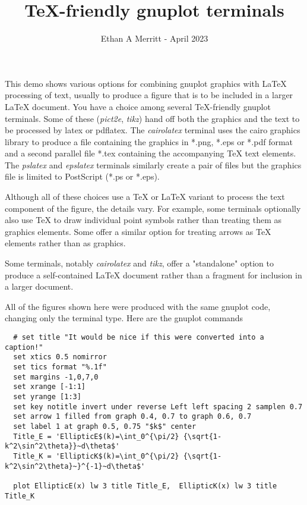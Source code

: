 \documentclass[letterpaper,11pt]{article}
\begin{document}
\title {\vspace{-.75in} \TeX-friendly gnuplot terminals \vspace{-5pt}}
\author{Ethan A Merritt - April 2023}
\date{}
\maketitle

This demo shows various options for combining gnuplot graphics with
{\LaTeX} processing of text, usually to produce a figure that is to be
included in a larger {\LaTeX} document.
You have a choice among several \TeX-friendly gnuplot terminals.
Some of these ({\em pict2e}, {\em tikz}) hand off both the graphics
and the text to be processed by latex or pdflatex.
The {\em cairolatex} terminal uses the cairo graphics library to produce
a file containing the graphics in *.png, *.eps or *.pdf format and a
second parallel file *.tex containing the accompanying {\TeX} text elements.
The {\em pslatex} and {\em epslatex} terminals similarly create a pair of
files but the graphics file is limited to PostScript (*.ps or *.eps).

Although all of these choices use a {\TeX} or {\LaTeX} variant to process the
text component of the figure, the details vary.  For example,
some terminals optionally also use {\TeX} to draw individual point
symbols rather than treating them as graphics elements. Some
offer a similar option for treating arrows as {\TeX} elements rather
than as graphics.

Some terminals, notably {\em cairolatex} and {\em tikz}, offer a
"standalone" option to produce a self-contained {\LaTeX} document
rather than a fragment for inclusion in a larger document.

All of the figures shown here were produced with the same gnuplot code,
changing only the terminal type.  Here are the gnuplot commands

\begin{framed}
\begin{minipage}{\textwidth}
\begin{verbatim}
  # set title "It would be nice if this were converted into a caption!"
  set xtics 0.5 nomirror
  set tics format "%.1f"
  set margins -1,0,7,0
  set xrange [-1:1]
  set yrange [1:3]
  set key notitle invert under reverse Left left spacing 2 samplen 0.7
  set arrow 1 filled from graph 0.4, 0.7 to graph 0.6, 0.7
  set label 1 at graph 0.5, 0.75 "$k$" center
  Title_E = 'EllipticE$(k)=\int_0^{\pi/2} {\sqrt{1-k^2\sin^2\theta}}~d\theta$'
  Title_K = 'EllipticK$(k)=\int_0^{\pi/2} {\sqrt{1-k^2\sin^2\theta}~}^{-1}~d\theta$'
  
  plot EllipticE(x) lw 3 title Title_E,  EllipticK(x) lw 3 title Title_K
\end{verbatim}
\end{minipage}
\end{framed}
\end{document}
